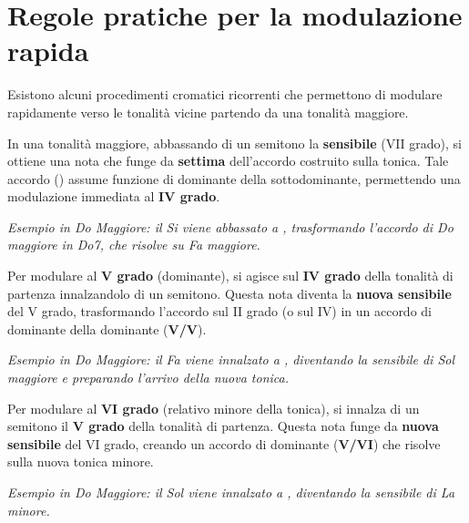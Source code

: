 \section{Regole pratiche per la modulazione rapida}
\label{sec:regole_pratiche_modulazione}

Esistono alcuni procedimenti cromatici ricorrenti che permettono di modulare rapidamente verso le tonalità vicine partendo da una tonalità maggiore.

\begin{regola}
	\label{reg:mod_iv_sensibile_abbassata}
	In una tonalità maggiore, abbassando di un semitono la \textbf{sensibile} (VII grado), si ottiene una nota che funge da \textbf{settima} dell'accordo costruito sulla tonica. Tale accordo (\textbf{}) assume funzione di dominante della sottodominante, permettendo una modulazione immediata al \textbf{IV grado}.
	
	\textit{Esempio in Do Maggiore: il Si viene abbassato a \Sibemolle , trasformando l'accordo di Do maggiore in Do7, che risolve su Fa maggiore.}
\end{regola}

\begin{regola}
	\label{reg:mod_v_quarto_innalzato}
	Per modulare al \textbf{V grado} (dominante), si agisce sul \textbf{IV grado} della tonalità di partenza innalzandolo di un semitono. Questa nota diventa la \textbf{nuova sensibile} del V grado, trasformando l'accordo sul II grado (o sul IV) in un accordo di dominante della dominante (\textbf{V/V}).
	
	\textit{Esempio in Do Maggiore: il Fa viene innalzato a \Fadiesis , diventando la sensibile di Sol maggiore e preparando l'arrivo della nuova tonica.}
\end{regola}

\begin{regola}
	\label{reg:mod_vi_quinto_innalzato}
	Per modulare al \textbf{VI grado} (relativo minore della tonica), si innalza di un semitono il \textbf{V grado} della tonalità di partenza. Questa nota funge da \textbf{nuova sensibile} del VI grado, creando un accordo di dominante (\textbf{V/VI}) che risolve sulla nuova tonica minore.
	
	\textit{Esempio in Do Maggiore: il Sol viene innalzato a \Soldiesis , diventando la sensibile di La minore.}
\end{regola}


